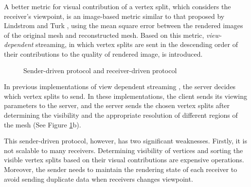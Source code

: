     A better metric for visual contribution of a vertex split, which considers the receiver's viewpoint, is an image-based metric similar 
    to that proposed 
    by Lindstrom and Turk
    \cite{353995}, using the mean square error between the rendered images
    of the original mesh and reconstructed mesh.   
    Based on this metric, \emph{view-dependent} streaming,
    in which vertex splits are sent in the descending order of 
    their contributions to the quality
    of rendered image, is introduced. 
    

    \begin{figure}
    \centering
    \caption{Sender-driven protocol and receiver-driven protocol 
    \label{dstream:protocol}}
    \end{figure}
    In previous implementations of view dependent streaming
    \cite{To1999, 363375, progressive:Yang, kim:view, zheng:interactive}, 
    the server decides which vertex splits to send. In these implementations,  
    the client sends its
    viewing parameters to the server, and the server sends the chosen vertex splits after
    determining the visibility and the appropriate resolution of 
    different regions of the mesh (See Figure \ref{dstream:protocol}b).
    
    This sender-driven protocol, however, has two significant weaknesses.
    Firstly, it is not scalable to many receivers. Determining visibility of vertices
    and sorting the visible vertex splits based on their visual contributions
    are expensive operations. 
    Moreover, the sender needs to maintain
    the rendering state of each receiver to avoid sending duplicate data when receivers
    changes viewpoint.

